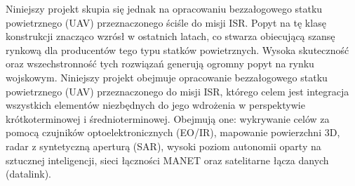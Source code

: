         Niniejszy projekt skupia się jednak na opracowaniu bezzałogowego statku powietrznego (UAV) przeznaczonego ściśle do misji ISR. 
        Popyt na tę klasę konstrukcji znacząco wzrósł w ostatnich latach, 
        co stwarza obiecującą szansę rynkową dla producentów tego typu statków powietrznych.
        Wysoka skuteczność oraz wszechstronność tych rozwiązań generują ogromny popyt na rynku wojskowym.
        Niniejszy projekt obejmuje opracowanie bezzałogowego statku powietrznego (UAV) przeznaczonego do misji ISR, 
        którego celem jest integracja wszystkich elementów niezbędnych do jego wdrożenia w perspektywie krótkoterminowej i średnioterminowej. 
        Obejmują one: wykrywanie celów za pomocą czujników optoelektronicznych (EO/IR), 
        mapowanie powierzchni 3D, radar z syntetyczną aperturą (SAR), 
        wysoki poziom autonomii oparty na sztucznej inteligencji, 
        sieci łączności MANET oraz satelitarne łącza danych (datalink).
